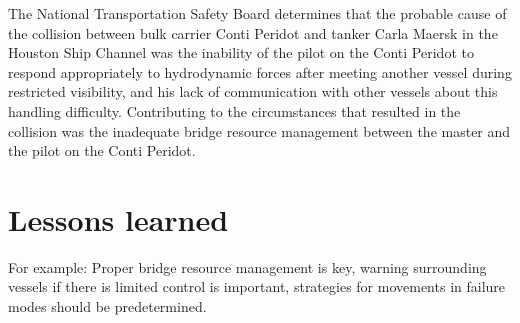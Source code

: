 The National Transportation Safety Board determines that the probable cause of the collision between bulk carrier Conti Peridot and tanker Carla Maersk in the Houston Ship Channel was the inability of the pilot on the Conti Peridot to respond appropriately to hydrodynamic forces after meeting another vessel during restricted visibility, and his lack of communication with other vessels about this handling difficulty. Contributing to the circumstances that resulted in the collision was the inadequate bridge resource management between the master and the pilot on the Conti Peridot. \cite{NTSB2016}\cite{NTSB2016a}

\section{Lessons learned}
For example: Proper bridge resource management is key, warning surrounding vessels if there is limited control is important, strategies for movements in failure modes should be predetermined.


